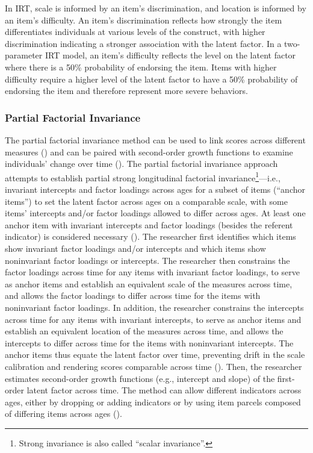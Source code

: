 \documentclass[
  american,
  letterpaper,
  12pt]{article}
\begin{document}
In IRT, scale is informed by an item's discrimination, and location is
informed by an item's difficulty. An item's discrimination reflects how
strongly the item differentiates individuals at various levels of the
construct, with higher discrimination indicating a stronger association
with the latent factor. In a two-parameter IRT model, an item's
difficulty reflects the level on the latent factor where there is a 50\%
probability of endorsing the item. Items with higher difficulty require
a higher level of the latent factor to have a 50\% probability of
endorsing the item and therefore represent more severe behaviors.

\subsubsection{Partial Factorial
Invariance}\label{partial-factorial-invariance}

The partial factorial invariance method can be used to link scores
across different measures () and can be paired with second-order growth functions to examine
individuals' change over time (). The partial factorial invariance approach attempts to
establish partial strong longitudinal factorial
invariance\footnote{Strong invariance is also called ``scalar
  invariance''.}---i.e., invariant intercepts and factor loadings across
ages for a subset of items (``anchor items'') to set the latent factor
across ages on a comparable scale, with some items' intercepts and/or
factor loadings allowed to differ across ages. At least one anchor item
with invariant intercepts and factor loadings (besides the referent
indicator) is considered necessary (). The researcher first identifies which items show
invariant factor loadings and/or intercepts and which items show
noninvariant factor loadings or intercepts. The researcher then
constrains the factor loadings across time for any items with invariant
factor loadings, to serve as anchor items and establish an equivalent
scale of the measures across time, and allows the factor loadings to
differ across time for the items with noninvariant factor loadings. In
addition, the researcher constrains the intercepts across time for any
items with invariant intercepts, to serve as anchor items and establish
an equivalent location of the measures across time, and allows the
intercepts to differ across time for the items with noninvariant
intercepts. The anchor items thus equate the latent factor over time,
preventing drift in the scale calibration and rendering scores
comparable across time (). Then, the researcher estimates second-order growth functions
(e.g., intercept and slope) of the first-order latent factor across
time. The method can allow different indicators across ages, either by
dropping or adding indicators or by using item parcels composed of
differing items across ages ().
\end{document}

